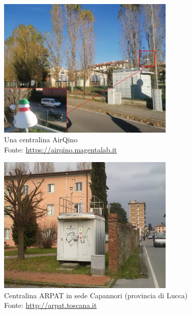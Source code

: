 \begin{figure}[H]
\centering
\captionsetup{justification=centering}
\includegraphics[width=0.75\textwidth,height=\textheight,keepaspectratio]{img/smart72.jpg}
\caption{Una centralina AirQino\\Fonte: \url{https://airqino.magentalab.it}}
\label{fig:smart72}
\end{figure}

\clearpage
\begin{figure}[H]
\centering
\captionsetup{justification=centering}
\includegraphics[width=0.75\textwidth,height=\textheight,keepaspectratio]{img/lu-capannori.jpg}
\caption{Centralina ARPAT in sede Capannori (provincia di Lucca)\\Fonte: \url{http://arpat.toscana.it}}
\label{fig:capannori}
\end{figure}

